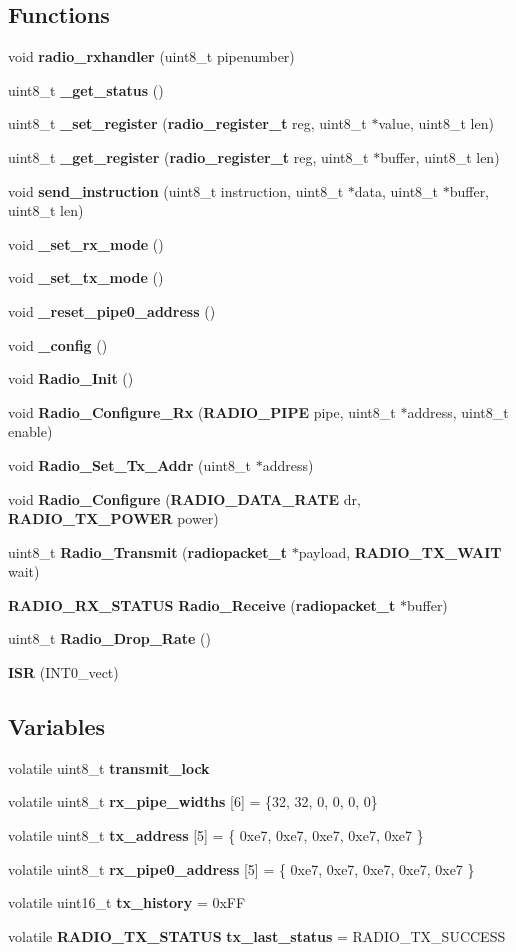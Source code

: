 \subsection*{Functions}
\begin{CompactItemize}
\item 
void {\bf radio\_\-rxhandler} (uint8\_\-t pipenumber)
\item 
uint8\_\-t {\bf \_\-get\_\-status} ()
\item 
uint8\_\-t {\bf \_\-set\_\-register} ({\bf radio\_\-register\_\-t} reg, uint8\_\-t $\ast$value, uint8\_\-t len)
\item 
uint8\_\-t {\bf \_\-get\_\-register} ({\bf radio\_\-register\_\-t} reg, uint8\_\-t $\ast$buffer, uint8\_\-t len)
\item 
void {\bf send\_\-instruction} (uint8\_\-t instruction, uint8\_\-t $\ast$data, uint8\_\-t $\ast$buffer, uint8\_\-t len)
\item 
void {\bf \_\-set\_\-rx\_\-mode} ()
\item 
void {\bf \_\-set\_\-tx\_\-mode} ()
\item 
void {\bf \_\-reset\_\-pipe0\_\-address} ()
\item 
void {\bf \_\-config} ()
\item 
void {\bf Radio\_\-Init} ()
\item 
void {\bf Radio\_\-Configure\_\-Rx} ({\bf RADIO\_\-PIPE} pipe, uint8\_\-t $\ast$address, uint8\_\-t enable)
\item 
void {\bf Radio\_\-Set\_\-Tx\_\-Addr} (uint8\_\-t $\ast$address)
\item 
void {\bf Radio\_\-Configure} ({\bf RADIO\_\-DATA\_\-RATE} dr, {\bf RADIO\_\-TX\_\-POWER} power)
\item 
uint8\_\-t {\bf Radio\_\-Transmit} ({\bf radiopacket\_\-t} $\ast$payload, {\bf RADIO\_\-TX\_\-WAIT} wait)
\item 
{\bf RADIO\_\-RX\_\-STATUS} {\bf Radio\_\-Receive} ({\bf radiopacket\_\-t} $\ast$buffer)
\item 
uint8\_\-t {\bf Radio\_\-Drop\_\-Rate} ()
\item 
{\bf ISR} (INT0\_\-vect)
\end{CompactItemize}
\subsection*{Variables}
\begin{CompactItemize}
\item 
volatile uint8\_\-t {\bf transmit\_\-lock}
\item 
volatile uint8\_\-t {\bf rx\_\-pipe\_\-widths} [6] = \{32, 32, 0, 0, 0, 0\}
\item 
volatile uint8\_\-t {\bf tx\_\-address} [5] = \{ 0xe7, 0xe7, 0xe7, 0xe7, 0xe7 \}
\item 
volatile uint8\_\-t {\bf rx\_\-pipe0\_\-address} [5] = \{ 0xe7, 0xe7, 0xe7, 0xe7, 0xe7 \}
\item 
volatile uint16\_\-t {\bf tx\_\-history} = 0x\-FF
\item 
volatile {\bf RADIO\_\-TX\_\-STATUS} {\bf tx\_\-last\_\-status} = RADIO\_\-TX\_\-SUCCESS
\end{CompactItemize}


